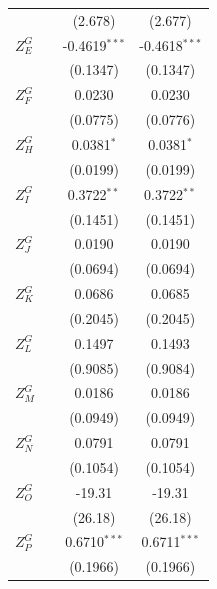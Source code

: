 \begin{tabular}{lccc}
                        &                & (2.678)         & (2.677)\\   
   $Z^{G}_E$            &                & -0.4619$^{***}$ & -0.4618$^{***}$\\   
                        &                & (0.1347)        & (0.1347)\\   
   $Z^{G}_F$            &                & 0.0230          & 0.0230\\   
                        &                & (0.0775)        & (0.0776)\\   
   $Z^{G}_H$            &                & 0.0381$^{*}$    & 0.0381$^{*}$\\   
                        &                & (0.0199)        & (0.0199)\\   
   $Z^{G}_I$            &                & 0.3722$^{**}$   & 0.3722$^{**}$\\   
                        &                & (0.1451)        & (0.1451)\\   
   $Z^{G}_J$            &                & 0.0190          & 0.0190\\   
                        &                & (0.0694)        & (0.0694)\\   
   $Z^{G}_K$            &                & 0.0686          & 0.0685\\   
                        &                & (0.2045)        & (0.2045)\\   
   $Z^{G}_L$            &                & 0.1497          & 0.1493\\   
                        &                & (0.9085)        & (0.9084)\\   
   $Z^{G}_M$            &                & 0.0186          & 0.0186\\   
                        &                & (0.0949)        & (0.0949)\\   
   $Z^{G}_N$            &                & 0.0791          & 0.0791\\   
                        &                & (0.1054)        & (0.1054)\\   
   $Z^{G}_O$            &                & -19.31          & -19.31\\   
                        &                & (26.18)         & (26.18)\\   
   $Z^{G}_P$            &                & 0.6710$^{***}$  & 0.6711$^{***}$\\   
                        &                & (0.1966)        & (0.1966)\\   

\end{tabular}
